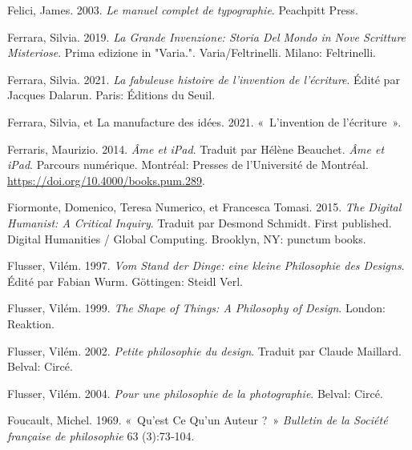 \begin{CSLReferences}{1}{0}
\leavevmode{}%
Felici, James. 2003. \emph{{Le manuel complet de typographie}}.
{Peachpitt Press}.

\leavevmode{}%
Ferrara, Silvia. 2019. \emph{La Grande Invenzione: Storia Del Mondo in
Nove Scritture Misteriose}. Prima edizione in "Varia.".
Varia/{Feltrinelli}. {Milano}: {Feltrinelli}.

\leavevmode{}%
Ferrara, Silvia. 2021. \emph{{La fabuleuse histoire de l'invention de
l'{é}criture}}. Édité par Jacques Dalarun. {Paris}: {{É}ditions du
Seuil}.

\leavevmode{}%
Ferrara, Silvia, et La manufacture des idées. 2021. {«~{L'invention de
l'{é}criture}~»}.

\leavevmode{}%
Ferraris, Maurizio. 2014. \emph{{{Â}me et iPad}}. Traduit par Hélène
Beauchet. \emph{{Â}me et iPad}. {Parcours num{é}rique}. {Montr{é}al}:
{Presses de l'Universit{é} de Montr{é}al}.
\url{https://doi.org/10.4000/books.pum.289}.

\leavevmode{}%
Fiormonte, Domenico, Teresa Numerico, et Francesca Tomasi. 2015.
\emph{The {Digital Humanist}: {A Critical Inquiry}}. Traduit par Desmond
Schmidt. First published. Digital Humanities / {Global} Computing.
{Brooklyn, NY}: {punctum books}.

\leavevmode{}%
Flusser, Vilém. 1997. \emph{{Vom Stand der Dinge: eine kleine
Philosophie des Designs}}. Édité par Fabian Wurm. {G{ö}ttingen}: {Steidl
Verl}.

\leavevmode{}%
Flusser, Vilém. 1999. \emph{The {Shape} of {Things}: {A Philosophy} of
{Design}}. {London}: {Reaktion}.

\leavevmode{}%
Flusser, Vilém. 2002. \emph{{Petite philosophie du design}}. Traduit par
Claude Maillard. {Belval}: {Circ{é}}.

\leavevmode{}%
Flusser, Vilém. 2004. \emph{{Pour une philosophie de la photographie}}.
{Belval}: {Circ{é}}.

\leavevmode{}%
Foucault, Michel. 1969. {«~Qu'est Ce Qu'un Auteur ?~»} \emph{Bulletin de
la Soci{é}t{é} fran{ç}aise de philosophie} 63 (3):73‑104.


\end{CSLReferences}
